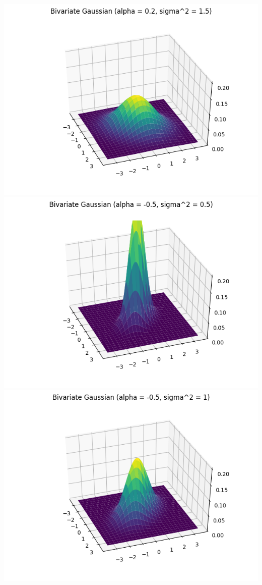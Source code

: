 \documentclass{article}
\begin{document}
\includegraphics[width=\linewidth]{Bivariate Gaussian (alpha = 0.2, sigma^2 = 1.5).png}
\includegraphics[width=\linewidth]{Bivariate Gaussian (alpha = -0.5, sigma^2 = 0.5).png}
\includegraphics[width=\linewidth]{Bivariate Gaussian (alpha = -0.5, sigma^2 = 1).png}
\end{document}
